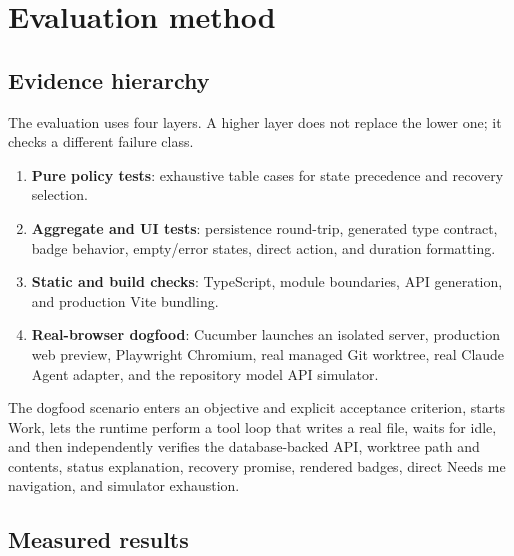\documentclass[10pt,a4paper]{article}
\begin{document}
\section{Evaluation method}

\subsection{Evidence hierarchy}

The evaluation uses four layers.  A higher layer does not replace the lower
one; it checks a different failure class.

\begin{enumerate}
  \item \textbf{Pure policy tests}: exhaustive table cases for state precedence
        and recovery selection.
  \item \textbf{Aggregate and UI tests}: persistence round-trip, generated type
        contract, badge behavior, empty/error states, direct action, and
        duration formatting.
  \item \textbf{Static and build checks}: TypeScript, module boundaries, API
        generation, and production Vite bundling.
  \item \textbf{Real-browser dogfood}: Cucumber launches an isolated server,
        production web preview, Playwright Chromium, real managed Git worktree,
        real Claude Agent adapter, and the repository model API simulator.
\end{enumerate}

The dogfood scenario enters an objective and explicit acceptance criterion,
starts Work, lets the runtime perform a tool loop that writes a real file,
waits for idle, and then independently verifies the database-backed API,
worktree path and contents, status explanation, recovery promise, rendered
badges, direct Needs me navigation, and simulator exhaustion.

\subsection{Measured results}
\end{document}
